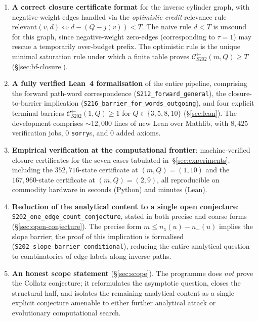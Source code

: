 \documentclass[11pt,a4paper]{article}
\theoremstyle{plain}
\theoremstyle{definition}
\newcommand{\relevant}{\mathrm{relevant}}
\newcommand{\Cback}{\mathcal{C}^{\!\leftarrow}_{S202}}
\newcommand{\numOnes}{n_{\mathtt{1}}}
\newcommand{\numNeg}{n_{\!-}}
\begin{document}
\begin{enumerate}
\item \textbf{A correct closure certificate format} for the inverse
      cylinder graph, with negative-weight edges handled via the
      \emph{optimistic credit} relevance rule
      \(\relevant(v, d) \iff d - (Q - j(v)) < T\). The naive rule
      $d < T$ is unsound for this graph, since negative-weight
      zero-edges (corresponding to $\tau = 1$) may rescue a temporarily
      over-budget prefix. The optimistic rule is the unique minimal
      saturation rule under which a finite table proves
      $\Cback(m, Q) \ge T$
      (\S\ref{sec:bf-closure}).

\item \textbf{A fully verified Lean~4 formalisation} of the entire
      pipeline, comprising the forward path-word correspondence
      (\texttt{S212\_forward\_general}), the
      closure-to-barrier implication
      (\texttt{S216\_barrier\_for\_words\_outgoing}), and four
      explicit terminal barriers
      $\Cback(1, Q) \ge 1$ for $Q \in \{3, 5, 8, 10\}$
      (\S\ref{sec:lean}).
      The development comprises $\sim 12{,}000$ lines of new Lean over
      Mathlib, with $8{,}425$ verification jobs, $0$ \texttt{sorry}s,
      and $0$ added axioms.

\item \textbf{Empirical verification at the computational frontier}:
      machine-verified closure certificates for the seven cases
      tabulated in~\S\ref{sec:experiments}, including the
      $352{,}716$-state certificate at $(m,Q) = (1,10)$ and the
      $167{,}960$-state certificate at $(m,Q) = (2,9)$, all reproducible
      on commodity hardware in seconds (Python) and minutes (Lean).

\item \textbf{Reduction of the analytical content to a single open
      conjecture}: \texttt{S202\_one\_edge\_count\_conjecture}, stated
      in both precise and coarse forms (\S\ref{sec:open-conjecture}).
      The precise form
      $m \le \numOnes(u) - \numNeg(u)$
      implies the slope barrier; the proof of this implication is
      formalised (\texttt{S202\_slope\_barrier\_conditional}), reducing
      the entire analytical question to combinatorics of edge labels
      along inverse paths.

\item \textbf{An honest scope statement} (\S\ref{sec:scope}). The
      programme does \emph{not} prove the Collatz conjecture; it
      reformulates the asymptotic question, closes the structural
      half, and isolates the remaining analytical content as a single
      explicit conjecture amenable to either further analytical
      attack or evolutionary computational search.
\end{enumerate}
\end{document}
